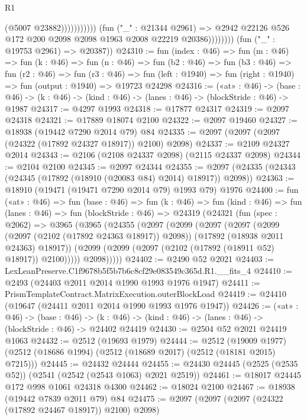 \begin{lexlean}{R1}
\begin{coremodule}
                                        (@5007 @23882)))))))))))
                    (fun ("_" : @21344 @2961) =>
                    @2942 @22126 @526 @172 @200 @2098 @2098 @1963 @2008 @22219 @20386))))))))
      (fun ("_" : @19753 @2961) => @20387))
@24310 := fun (index : @46) =>
  fun (m : @46) =>
  fun (k : @46) =>
  fun (n : @46) =>
  fun (b2 : @46) =>
  fun (b3 : @46) =>
  fun (r2 : @46) =>
  fun (r3 : @46) =>
  fun (left : @1940) => fun (right : @1940) => fun (output : @1940) => @19723 @24298
@24316 := («at» : @46) ->
  (base : @46) -> (k : @46) -> (kind : @46) -> (lanes : @46) -> (blockStride : @46) -> @1987
@24317 := @4297 @1993
@24318 := @17877 @24317
@24319 := @2097 @24318
@24321 := @17889 @18074 @2100
@24322 := @2097 @19460
@24327 := @18938 (@19442 @7290 @2014 @79) @84
@24335 := @2097 (@2097 (@2097 (@24322 (@17892 @24327 @18917)) @2100) @2098)
@24337 := @2109 @24327 @2014
@24343 := @2106 (@2108 @24337 @2098) (@2115 @24337 @2098)
@24344 := @2104 @2100
@24345 := @2097 @24344
@24355 := @2097 (@24335 (@24343 (@24345 (@17892 (@18910 (@20083 @84) @2014) @18917)) @2098))
@24363 := @18910 (@19471 (@19471 @7290 @2014 @79) @1993 @79) @1976
@24400 := fun («at» : @46) =>
  fun (base : @46) =>
  fun (k : @46) =>
  fun (kind : @46) =>
  fun (lanes : @46) =>
  fun (blockStride : @46) =>
  @24319
    (@24321
      (fun (spec : @2062) =>
      @3965
        (@3965
          (@24355
            (@2097
              (@2099
                (@2097
                  (@2097
                    (@2099 (@2097 (@2102 (@17892 @24363 @18917)) @2098))
                    (@17892 (@18938 @2011 @24363) @18917))
                  (@2099 (@2099 (@2097 (@2102 (@17892 (@18911 @52) @18917)) @2100)))))
              @2098)))))
@24402 := @2490 @52 @2021
@24403 := LexLeanPreserve.C1f9678b5f5b7b6c8cf29e083549c365d.R1.__fits_4
@24410 := @2493 (@24403 @2011 @2014 @1990 @1993 @1976 @1947)
@24411 := PrismTemplateContract.MatrixExecution.outerBlockLoad
@24419 := @24410 (@19647 (@24411 @2011 @2014 @1990 @1993 @1976 @1947))
@24426 := («at» : @46) ->
  (base : @46) -> (k : @46) -> (kind : @46) -> (lanes : @46) -> (blockStride : @46) -> @24402 @24419
@24430 := @2504 @52 @2021 @24419 @1063
@24432 := @2512 (@19693 @1979)
@24444 := @2512
    (@19009 @1977)
    (@2512 (@18686 @1994) (@2512 (@18689 @2017) (@2512 (@18181 @2015) @7215)))
@24445 := @24432 @24444
@24455 := @24430 @24445 (@2525 (@2535 @52)) (@2541 (@2542 (@2543 @1063) @2021 @2519))
@24461 := @18017 @24445 @172 @998 @1061 @24318 @4300
@24462 := @18024 @2100
@24467 := @18938 (@19442 @7839 @2011 @79) @84
@24475 := @2097 (@2097 (@2097 (@24322 (@17892 @24467 @18917)) @2100) @2098)

\end{coremodule}
\end{lexlean}
